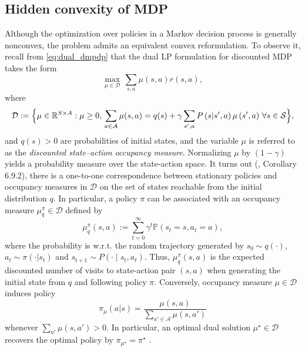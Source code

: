 \documentclass{article}
\numberwithin{equation}{section}
\newcommand{\R}{\mathbb{R}}
\newcommand{\cA}{\mathcal{A}}
\begin{document}
\subsection{Hidden convexity of MDP}
Although the optimization over policies in a Markov decision process is generally nonconvex, the problem admits an equivalent convex reformulation.
To observe it, recall from \eqref{eq:dual_dmpdp} that the dual LP formulation for discounted MDP takes the form
$$
	\max_{\mu \in \mathcal{D}}\, \sum_{s, a} \mu(s, a) r(s,a),
$$
where
$$
    \mathcal{D}:=\Bigl\{\mu \in \R^{S \times A} : \mu \geq 0,\, \sum_{a\in\cA} \mu(s, a)=q(s)+\gamma \sum_{s^{\prime}, a} P\left(s | s^{\prime}, a\right) \mu\left(s^{\prime}, a\right)\, \forall s \in \mathcal{S}\Bigr\},
$$
and $q(s)>0$ are probabilities of initial states, and the variable $\mu$ is referred to as
the \emph{discounted state–action occupancy measure}. Normalizing $\mu$ by $(1-\gamma)$ yields a probability measure over the state-action space.
It turns out (\cite{putermanMDP}, Corollary 6.9.2), there is a one-to-one correspondence between stationary policies and occupancy measures in $\mathcal D$ on the set of states reachable from the initial distribution $q$. In particular, a policy $\pi$ can be associated with an occupancy measure $\mu_q^\pi\in \mathcal{D}$ defined by
\[
\mu_q^\pi(s,a):=
\sum_{t=0}^\infty \gamma^t \mathbb{P}\left(s_t=s, a_t=a
\right),
\]
where the probability is w.r.t. the random trajectory generated by $s_0\sim q(\cdot)$, $a_t\sim \pi(\cdot|s_t)$ and $s_{t+1} \sim P(\cdot \mid s_t, a_t)$. Thus, $\mu_q^\pi(s,a)$ is the expected discounted number of visits to state-action pair $(s, a)$ when generating the initial state from $q$ and following policy $\pi$.
Conversely, occupancy measure $\mu \in \mathcal{D}$ induces policy
$$
	\pi_\mu(a | s) = \frac{\mu(s, a)}{\sum_{a'\in\cA} \mu(s, a')}
$$
whenever $\sum_{a'}\mu(s,a')>0.$
In particular, an optimal dual solution $\mu^\star \in \mathcal{D}$ recovers the optimal policy by $\pi_{\mu^\star}=\pi^\star$ \citep[Theorem 6.9.4]{putermanMDP}.
\end{document}

